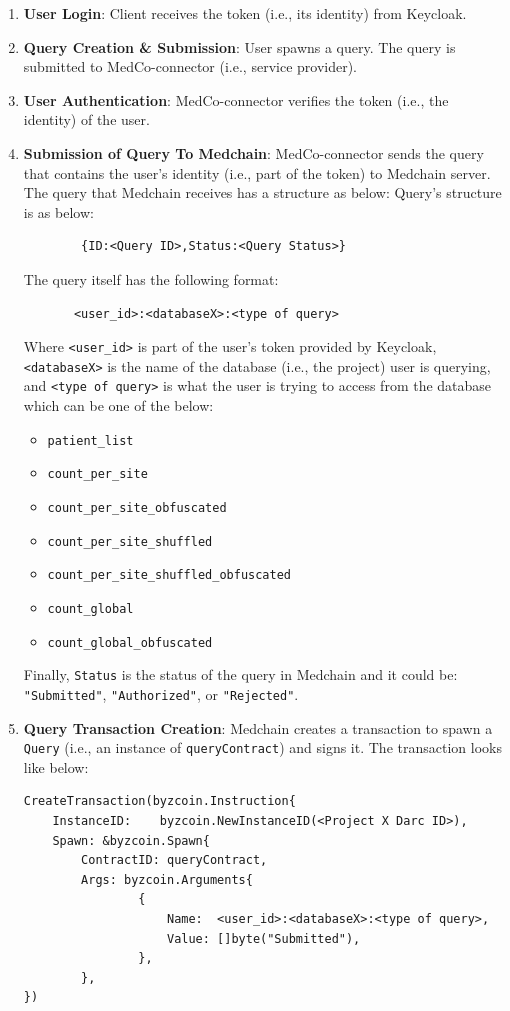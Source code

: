 \begin{enumerate}
    \item \textbf{User Login}: Client receives the token (i.e., its identity) from Keycloak.
    
    \item \textbf{Query Creation \& Submission}: User spawns a query. The query is submitted to MedCo-connector (i.e., service provider). 
    
    \item \textbf{User Authentication}: MedCo-connector verifies the token (i.e., the identity) of the user. 
    
    \item \textbf{Submission of Query To Medchain}: MedCo-connector sends the query that contains the user’s identity (i.e., part of the token) to Medchain server. The query that Medchain receives has a structure as below:
    Query's structure is as below:
    \begin{verbatim}
        {ID:<Query ID>,Status:<Query Status>}
    \end{verbatim}
The query itself has the following format:
   \begin{verbatim}
       <user_id>:<databaseX>:<type of query>
   \end{verbatim}
   Where \texttt{<user\_id>} is part of the user's token provided by Keycloak, \texttt{<databaseX>} is the name of the database (i.e., the project) user is querying, and \texttt{<type of query>} is what the user is trying to access from the database which can be one of the below:
   \begin{itemize}
        \item \texttt{patient\_list}
        \item \texttt{count\_per\_site}
        \item \texttt{count\_per\_site\_obfuscated}
        \item \texttt{count\_per\_site\_shuffled}
        \item \texttt{count\_per\_site\_shuffled\_obfuscated}
        \item \texttt{count\_global}
        \item \texttt{count\_global\_obfuscated}
   \end{itemize}
   
   Finally, \texttt{Status} is the status of the query in Medchain and it could be: \texttt{"Submitted"}, \texttt{"Authorized"}, or \texttt{"Rejected"}.
   
    \item \textbf{Query Transaction Creation}: \label{workflow:step 5}
    Medchain creates a transaction to spawn a \texttt{Query} (i.e., an instance of \texttt{queryContract}) and signs it. The transaction looks like below:
        \begin{verbatim}
CreateTransaction(byzcoin.Instruction{
    InstanceID:    byzcoin.NewInstanceID(<Project X Darc ID>),
    Spawn: &byzcoin.Spawn{
        ContractID: queryContract,
        Args: byzcoin.Arguments{
                {
                    Name:  <user_id>:<databaseX>:<type of query>,
                    Value: []byte("Submitted"),
                },
        },
})
        \end{verbatim}
        

\end{enumerate}

